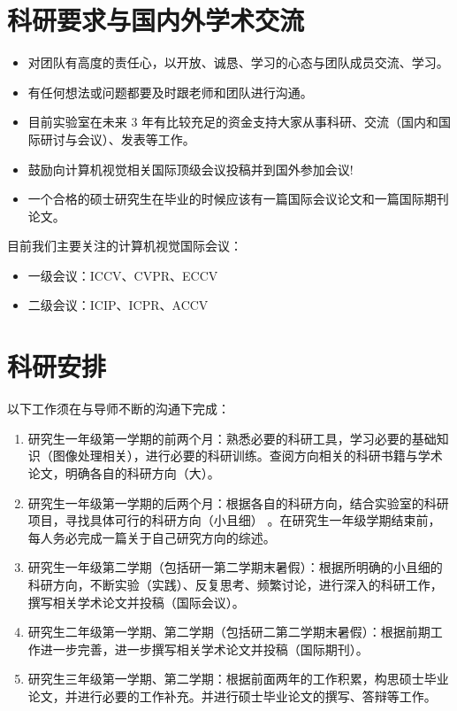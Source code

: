 \documentclass[a4paper，12pt]{article}
\begin{document}
\section{科研要求与国内外学术交流}

\begin{itemize}
\item 对团队有高度的责任心，以开放、诚恳、学习的心态与团队成员交流、学习。
\item 有任何想法或问题都要及时跟老师和团队进行沟通。
\item 目前实验室在未来 3 年有比较充足的资金支持大家从事科研、交流（国内和国际研讨与会议）、发表等工作。
\item 鼓励向计算机视觉相关国际顶级会议投稿并到国外参加会议!
\item 一个合格的硕士研究生在毕业的时候应该有一篇国际会议论文和一篇国际期刊论文。
\end{itemize}

目前我们主要关注的计算机视觉国际会议：

\begin{itemize}
\item 一级会议：ICCV、CVPR、ECCV
\item 二级会议：ICIP、ICPR、ACCV
\end{itemize}
\section{科研安排}

以下工作须在与导师不断的沟通下完成：

\begin{enumerate}
\item 研究生一年级第一学期的前两个月：熟悉必要的科研工具，学习必要的基础知识（图像处理相关），进行必要的科研训练。查阅方向相关的科研书籍与学术论文，明确各自的科研方向（大）。
\item 研究生一年级第一学期的后两个月：根据各自的科研方向，结合实验室的科研项目，寻找具体可行的科研方向（小且细） 。在研究生一年级学期结束前，每人务必完成一篇关于自己研究方向的综述。
\item 研究生一年级第二学期（包括研一第二学期末暑假）：根据所明确的小且细的科研方向，不断实验（实践）、反复思考、频繁讨论，进行深入的科研工作，撰写相关学术论文并投稿（国际会议）。
\item 研究生二年级第一学期、第二学期（包括研二第二学期末暑假）：根据前期工作进一步完善，进一步撰写相关学术论文并投稿（国际期刊）。
\item 研究生三年级第一学期、第二学期：根据前面两年的工作积累，构思硕士毕业论文，并进行必要的工作补充。并进行硕士毕业论文的撰写、答辩等工作。
\end{enumerate}
\end{document}
